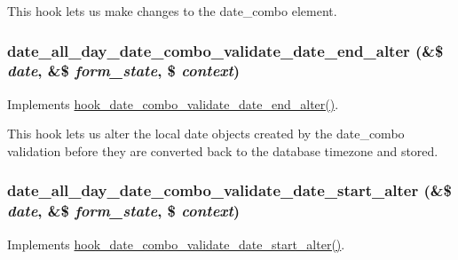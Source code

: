 This hook lets us make changes to the date\_\-combo element. \hypertarget{date__all__day_8module_ad17a2337943546db27ba8cd7da71ce5b}{
\subsubsection[{date\_\-all\_\-day\_\-date\_\-combo\_\-validate\_\-date\_\-end\_\-alter}]{\setlength{\rightskip}{0pt plus 5cm}date\_\-all\_\-day\_\-date\_\-combo\_\-validate\_\-date\_\-end\_\-alter (\&\$ {\em date}, \/  \&\$ {\em form\_\-state}, \/  \$ {\em context})}}
\label{date__all__day_8module_ad17a2337943546db27ba8cd7da71ce5b}
Implements \hyperlink{date_8api_8php_ae400f94244ac446f9682e71a57b14f9b}{hook\_\-date\_\-combo\_\-validate\_\-date\_\-end\_\-alter()}.

This hook lets us alter the local date objects created by the date\_\-combo validation before they are converted back to the database timezone and stored. \hypertarget{date__all__day_8module_ac75e5076e22ad57fda35eb39d010d85a}{
\subsubsection[{date\_\-all\_\-day\_\-date\_\-combo\_\-validate\_\-date\_\-start\_\-alter}]{\setlength{\rightskip}{0pt plus 5cm}date\_\-all\_\-day\_\-date\_\-combo\_\-validate\_\-date\_\-start\_\-alter (\&\$ {\em date}, \/  \&\$ {\em form\_\-state}, \/  \$ {\em context})}}
\label{date__all__day_8module_ac75e5076e22ad57fda35eb39d010d85a}
Implements \hyperlink{date_8api_8php_a1a8f0f571d13297a9882ec71a9196692}{hook\_\-date\_\-combo\_\-validate\_\-date\_\-start\_\-alter()}.

